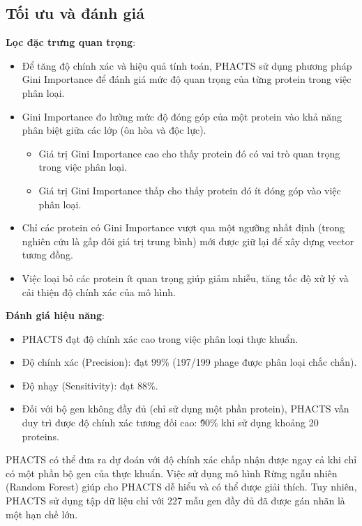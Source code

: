 \subsection{Tối ưu và đánh giá}

\textbf{Lọc đặc trưng quan trọng}:
    \begin{itemize}
        \item Để tăng độ chính xác và hiệu quả tính toán, PHACTS sử dụng phương pháp Gini Importance để đánh giá mức độ quan trọng của từng protein trong việc phân loại. 
        \item Gini Importance đo lường mức độ đóng góp của một protein vào khả năng phân biệt giữa các lớp (ôn hòa và độc lực).
            \begin{itemize}
                \item Giá trị Gini Importance cao cho thấy protein đó có vai trò quan trọng trong việc phân loại.
                \item Giá trị Gini Importance thấp cho thấy protein đó ít đóng góp vào việc phân loại. 
            \end{itemize}
         \item Chỉ các protein có Gini Importance vượt qua một ngưỡng nhất định (trong nghiên cứu là gấp đôi giá trị trung bình) mới được giữ lại để xây dựng vector tương đồng. 
         \item Việc loại bỏ các protein ít quan trọng giúp giảm nhiễu, tăng tốc độ xử lý và cải thiện độ chính xác của mô hình.
    \end{itemize}
    
\textbf{Đánh giá hiệu năng}: 
    \begin{itemize}
        \item PHACTS đạt độ chính xác cao trong việc phân loại thực khuẩn.
        \item Độ chính xác (Precision): đạt 99\% (197/199 phage được phân loại chắc chắn). 
        \item Độ nhạy (Sensitivity): đạt 88\%. 
        \item Đối với bộ gen không đầy đủ (chỉ sử dụng một phần protein), PHACTS vẫn duy trì được độ chính xác tương đối cao: \~90\% khi sử dụng khoảng 20 proteins. 
    \end{itemize}

PHACTS có thể đưa ra dự đoán với độ chính xác chấp nhận được ngay cả khi chỉ có một phần bộ gen của thực khuẩn. Việc sử dụng mô hình Rừng ngẫu nhiên (Random Forest) giúp cho PHACTS dễ hiểu và có thể được giải thích. Tuy nhiên, PHACTS sử dụng tập dữ liệu chỉ với 227 mẫu gen đầy đủ đã được gán nhãn là một hạn chế lớn. 

